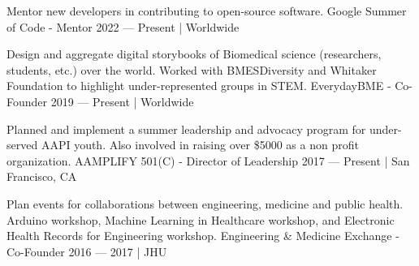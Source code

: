 

\begin{cventries}

    \cvpresentation
    {Mentor new developers in contributing to open-source software.} %
    {Google Summer of Code - Mentor} %
    {2022 --- Present | Worldwide} %
    {} %
    {\empty}
    {\empty}
    \vspace{-.9cm}   
    
    \cvpresentation
    {Design and aggregate digital storybooks of Biomedical science (researchers, students, etc.) over the world. Worked with BMESDiversity and Whitaker Foundation to highlight under-represented groups in STEM.} %
    {EverydayBME - Co-Founder} %
    {2019 --- Present | Worldwide} %
    {} %
    {\empty}
    {\empty}
    \vspace{-.9cm}
    
    \cvpresentation
    {Planned and implement a summer leadership and advocacy program for under-served AAPI youth. Also involved in raising over \$5000 as a non profit organization.} %
    {AAMPLIFY 501(C) - Director of Leadership} %
    {2017 --- Present | San Francisco, CA} %
    {} %
    {\empty}
    {\empty}
    \vspace{-.9cm}
    
    \cvpresentation
    {Plan events for collaborations between engineering, medicine and public health. Arduino workshop, Machine Learning in Healthcare workshop, and Electronic Health Records for Engineering workshop.} %
    {Engineering \& Medicine Exchange - Co-Founder} %
    {2016 --- 2017 | JHU} %
    {} %
    {\empty}
    {\empty}
    \vspace{-.9cm}
    

\end{cventries}
